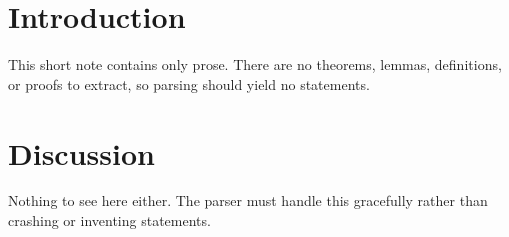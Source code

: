 \documentclass{article}
\begin{document}
\section{Introduction}
This short note contains only prose. There are no theorems, lemmas, definitions,
or proofs to extract, so parsing should yield no statements.

\section{Discussion}
Nothing to see here either. The parser must handle this gracefully rather than
crashing or inventing statements.
\end{document}
